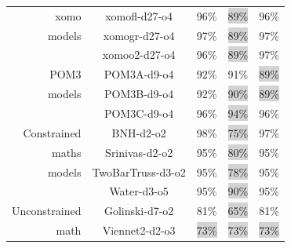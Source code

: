 \documentclass[10pt,journal,compsoc]{IEEEtran}
\newenvironment{changed}{\par\color{MyDarkBlue}}{\par}
\begin{document}
\begin{changed}
\begin{figure}[!t]
\begin{tabular}{|r|c|c|c|c|}
xomo 	&	xomofl-d27-o4	&	96\%	&	\colorbox{lightgray}{89\%}	&	96\%	\\
models	&	xomogr-d27-o4	&	97\%	&	\colorbox{lightgray}{89\%}	&	97\%	\\
	&	xomoo2-d27-o4	&	96\%	&	\colorbox{lightgray}{89\%}	&	97\%	\\
POM3 	&	POM3A-d9-o4	&	92\%	&	91\%	&	\colorbox{lightgray}{89\%}	\\
models	&	POM3B-d9-o4	&	92\%	&	\colorbox{lightgray}{90\%}	&	\colorbox{lightgray}{89\%}	\\
	&	POM3C-d9-o4	&	96\%	&	\colorbox{lightgray}{94\%}	&	96\%	\\ \hline
Constrained	&	BNH-d2-o2	&	98\%	&	\colorbox{lightgray}{75\%}	&	97\%	\\
maths&	Srinivas-d2-o2	&	95\%	&	\colorbox{lightgray}{80\%}	&	95\%	\\
models	&	TwoBarTruss-d3-o2	&	95\%	&	\colorbox{lightgray}{78\%}	&	95\%	\\
	&	Water-d3-o5	&	95\%	&	\colorbox{lightgray}{90\%}	&	95\%	\\ \hline
Unconstrained	&	Golinski-d7-o2	&	81\%	&	\colorbox{lightgray}{65\%}	&	81\%	\\
math	&	Viennet2-d2-o3	&	\colorbox{lightgray}{73\%}	&	\colorbox{lightgray}{73\%}	&	\colorbox{lightgray}{73\%}	\\

\end{tabular}
\end{figure}
\end{changed}
\end{document}
